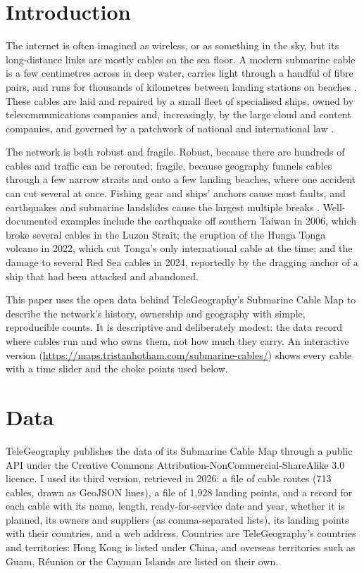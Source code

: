 \documentclass[11pt,a4paper]{article}
\begin{document}
\section{Introduction}
The internet is often imagined as wireless, or as something in the sky, but its long-distance links are mostly cables on the sea floor. A modern submarine cable is a few centimetres across in deep water, carries light through a handful of fibre pairs, and runs for thousands of kilometres between landing stations on beaches \citep{carter2009,starosielski2015}. These cables are laid and repaired by a small fleet of specialised ships, owned by telecommunications companies and, increasingly, by the large cloud and content companies, and governed by a patchwork of national and international law \citep{burnett2014}.

The network is both robust and fragile. Robust, because there are hundreds of cables and traffic can be rerouted; fragile, because geography funnels cables through a few narrow straits and onto a few landing beaches, where one accident can cut several at once. Fishing gear and ships' anchors cause most faults, and earthquakes and submarine landslides cause the largest multiple breaks \citep{carter2009}. Well-documented examples include the earthquake off southern Taiwan in 2006, which broke several cables in the Luzon Strait; the eruption of the Hunga Tonga volcano in 2022, which cut Tonga's only international cable at the time; and the damage to several Red Sea cables in 2024, reportedly by the dragging anchor of a ship that had been attacked and abandoned.

This paper uses the open data behind TeleGeography's Submarine Cable Map \citep{telegeography} to describe the network's history, ownership and geography with simple, reproducible counts. It is descriptive and deliberately modest: the data record where cables run and who owns them, not how much they carry. An interactive version (\url{https://maps.tristanhotham.com/submarine-cables/}) shows every cable with a time slider and the choke points used below.

\section{Data}
TeleGeography publishes the data of its Submarine Cable Map through a public API under the Creative Commons Attribution-NonCommercial-ShareAlike 3.0 licence. I used its third version, retrieved in 2026: a file of cable routes (713 cables, drawn as GeoJSON lines), a file of 1,928 landing points, and a record for each cable with its name, length, ready-for-service date and year, whether it is planned, its owners and suppliers (as comma-separated lists), its landing points with their countries, and a web address. Countries are TeleGeography's countries and territories: Hong Kong is listed under China, and overseas territories such as Guam, Réunion or the Cayman Islands are listed on their own.
\end{document}
